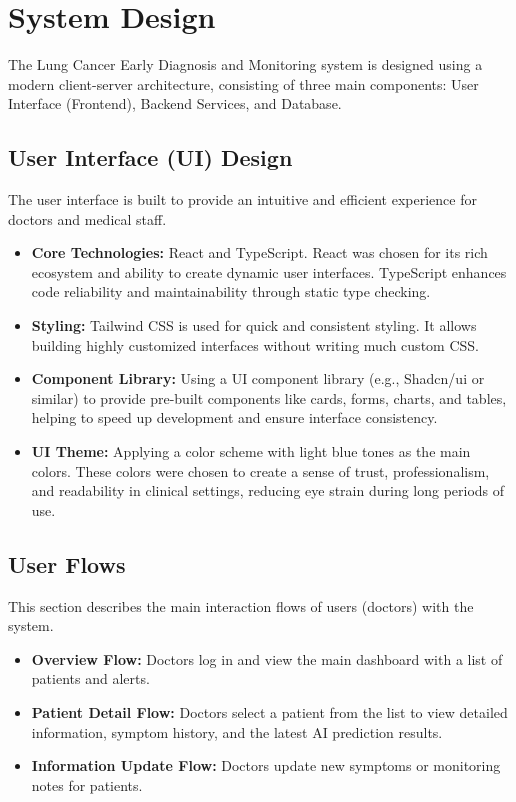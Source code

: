 \section{System Design}

The Lung Cancer Early Diagnosis and Monitoring system is designed using a modern client-server architecture, consisting of three main components: User Interface (Frontend), Backend Services, and Database.

\subsection{User Interface (UI) Design}

The user interface is built to provide an intuitive and efficient experience for doctors and medical staff.
\begin{itemize}
    \item \textbf{Core Technologies:} React and TypeScript. React was chosen for its rich ecosystem and ability to create dynamic user interfaces. TypeScript enhances code reliability and maintainability through static type checking.
    \item \textbf{Styling:} Tailwind CSS is used for quick and consistent styling. It allows building highly customized interfaces without writing much custom CSS.
    \item \textbf{Component Library:} Using a UI component library (e.g., Shadcn/ui or similar) to provide pre-built components like cards, forms, charts, and tables, helping to speed up development and ensure interface consistency.
    \item \textbf{UI Theme:} Applying a color scheme with light blue tones as the main colors. These colors were chosen to create a sense of trust, professionalism, and readability in clinical settings, reducing eye strain during long periods of use.
\end{itemize}

\subsection{User Flows}
This section describes the main interaction flows of users (doctors) with the system.
\begin{itemize}
    \item \textbf{Overview Flow:} Doctors log in and view the main dashboard with a list of patients and alerts.
    \item \textbf{Patient Detail Flow:} Doctors select a patient from the list to view detailed information, symptom history, and the latest AI prediction results.
    \item \textbf{Information Update Flow:} Doctors update new symptoms or monitoring notes for patients.
\end{itemize}

